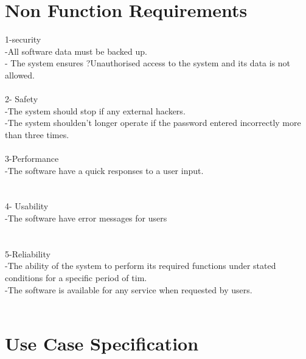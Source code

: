 \documentclass{article}
\begin{document}
    \section{Non Function Requirements}
    1-security\\
    -All software data must be backed up.\\
    - The system ensures ?Unauthorised access to the system and its data is not    allowed.\\\\
    
    2- Safety\\
    -The system should stop if any external hackers.\\
    -The system shoulden't longer operate if the password entered incorrectly      more than three times.\\\\
    
    3-Performance\\
    -The software have a quick responses to a user input.\\
    \\\\
    4- Usability\\
    -The software have error messages for users\\
    \\\\
    5-Reliability\\
    -The ability of the system to perform its required functions under stated conditions for a specific period of tim.\\
    -The software is available for any service when requested by users.
    \\\\
	\section{Use Case Specification}
	
\end{document}
